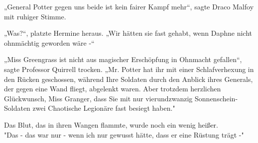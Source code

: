 {„General Potter gegen uns beide ist kein fairer Kampf mehr“, sagte Draco Malfoy mit ruhiger Stimme.

„Was?“, platzte Hermine heraus. „Wir hätten sie fast gehabt, wenn Daphne nicht ohnmächtig geworden wäre -“

„Miss Greengrass ist nicht aus magischer Erschöpfung in Ohnmacht gefallen“, sagte Professor Quirrell trocken. „Mr. Potter hat ihr mit einer Schlafverhexung in den Rücken geschossen, während Ihre Soldaten durch den Anblick ihres Generals, der gegen eine Wand fliegt, abgelenkt waren. Aber trotzdem herzlichen Glückwunsch, Miss Granger, dass Sie mit nur vierundzwanzig Sonnenschein-Soldaten zwei Chaotische Legionäre fast besiegt haben."

Das Blut, das in ihren Wangen flammte, wurde noch ein wenig heißer.\\ "Das - das war nur - wenn ich nur gewusst hätte, dass er eine Rüstung trägt -"

}
